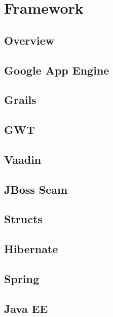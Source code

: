 \part{Framework}


\chapter{Overview}



\chapter{Google App Engine}



\chapter{Grails}



\chapter{GWT}



\chapter{Vaadin}



\chapter{JBoss Seam}



\chapter{Structs}



\chapter{Hibernate}



\chapter{Spring}



\chapter{Java EE}




